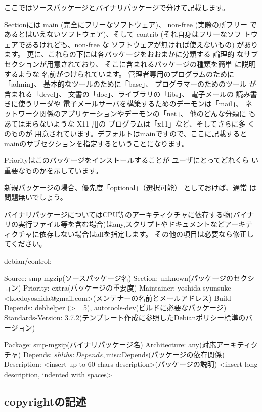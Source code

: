 \documentclass[mingoth,a4paper]{jsarticle}
\begin{document}
ここではソースパッケージとバイナリパッケージで分けて記載します。

Sectionには main (完全にフリーなソフトウェア)、 non-free (実際の所フリー
であるとはいえないソフトウェア)、そして contrib (それ自身はフリーなソフ
トウェアであるけれども、non-free な ソフトウェアが無ければ使えないもの)
があります。 更に、これらの下には各パッケージをおおまかに分類する 論理的
なサブセクションが用意されており、 そこに含まれるパッケージの種類を簡単
に説明するような 名前がつけられています。 管理者専用のプログラムのために
「admin」、 基本的なツールのために「base」、 プログラマーのためのツール
が含まれる「devel」、 文書の「doc」、ライブラリの「libs」、 電子メールの
読み書きに使うリーダや 電子メールサーバを構築するためのデーモンは「mail」、
ネットワーク関係のアプリケーションやデーモンの「net」、 他のどんな分類に
もあてはまらないような X11 用の プログラムは「x11」など、そしてさらに多
くのものが 用意されています。デフォルトはmainですので、ここに記載すると
mainのサブセクションを指定するということになります。

Priorityはこのパッケージをインストールすることが ユーザにとってどれくら
い重要なものかを示しています。

新規パッケージの場合、優先度「optional」（選択可能） としておけば、通常
は問題無いでしょう。

バイナリパッケージについてはCPU等のアーキティクチャに依存する物(バイナリの実行ファイル等を含む場合)はany,スクリプトやドキュメントなどアーキティクチャに依存しない場合はallを指定します。
その他の項目は必要なら修正してください。

debian/control:
\begin{commandline}
Source: smp-mgzip(ソースパッケージ名)
Section: unknown(パッケージのセクション)
Priority: extra(パッケージの重要度)
Maintainer: yoshida syunsuke <koedoyoshida@gmail.com>(メンテナーの名前とメールアドレス)
Build-Depends: debhelper (>= 5), autotools-dev(ビルドに必要なパッケージ)
Standards-Version: 3.7.2(テンプレート作成に参照したDebianポリシー標準のバージョン)

Package: smp-mgzip(バイナリパッケージ名)
Architecture: any(対応アーキティクチャ)
Depends: ${shlibs:Depends}, ${misc:Depends}(パッケージの依存関係)
Description: <insert up to 60 chars description>(パッケージの説明)
 <insert long description, indented with spaces>
\end{commandline}

\subsection{copyrightの記述}
\end{document}
